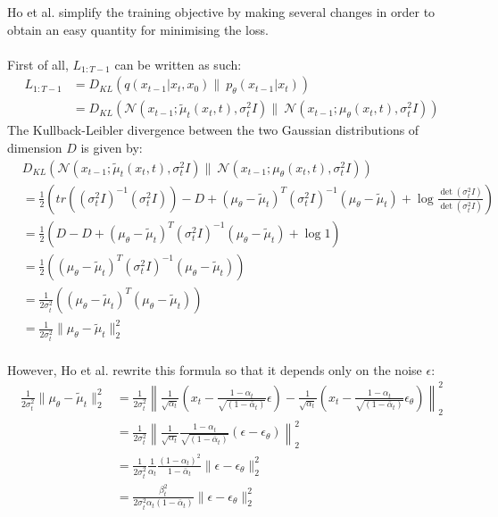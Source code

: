 \documentclass[twoside]{article}
\numberwithin{equation}{section}
\numberwithin{figure}{section}
\begin{document}
Ho et al. \cite{ho2020denoising} simplify the training objective by making several changes in order to obtain an easy quantity for minimising the loss. 
\\\\
First of all, $L_{1: T-1}$ can be written as such:
\begin{align}
  L_{1:T-1} &= D_{KL}\left(q\left(x_{t-1} | x_t, x_0\right) \| \: p_{\theta}\left(x_{t-1} | x_t\right)\right) \\
  &= D_{KL}\left(\mathcal{N} (x_{t-1}; \tilde{\mu}_t \left(x_t, t \right), \sigma^2_t I ) \| \: \mathcal{N} \left( x_{t-1} ; \mu_{\theta}(x_t, t), \sigma^2_t I  \right) \right)
\end{align}
{
  \allowdisplaybreaks
The Kullback-Leibler divergence between the two Gaussian distributions of dimension $D$ is given by:
  \begin{align}
    & D_{KL}\left(\mathcal{N} (x_{t-1}; \tilde{\mu}_t \left(x_t, t \right), \sigma^2_t I ) \| \: \mathcal{N} \left( x_{t-1} ; \mu_{\theta}(x_t, t), \sigma^2_t I  \right) \right) \\
    &= \frac{1}{2} \left( tr\left( (\sigma^2_t I)^{-1} (\sigma^2_t I) \right) - D + \left( \mu_{\theta} - \tilde{\mu}_t \right)^T (\sigma^2_t I)^{-1} \left( \mu_{\theta} - \tilde{\mu}_t \right) + \log \frac{\det(\sigma^2_t I)}{\det(\sigma^2_t I)} \right) \\
    &= \frac{1}{2} \left( D - D + \left( \mu_{\theta} - \tilde{\mu}_t \right)^T (\sigma^2_t I)^{-1} \left( \mu_{\theta} - \tilde{\mu}_t \right) + \log 1 \right) \\
    &= \frac{1}{2} \left( \left( \mu_{\theta} - \tilde{\mu}_t \right)^T (\sigma^2_t I)^{-1} \left( \mu_{\theta} - \tilde{\mu}_t \right) \right) \\
    &= \frac{1}{2 \sigma^2_t} \left( \left( \mu_{\theta} - \tilde{\mu}_t \right)^T \left( \mu_{\theta} - \tilde{\mu}_t \right) \right) \\
    &= \frac{1}{2 \sigma^2_t} \| \mu_{\theta} - \tilde{\mu}_t \|_2^2
  \end{align}
  \\
  However, Ho et al. \cite{ho2020denoising} rewrite this formula so that it depends only on the noise $\epsilon$:
  \begin{align}
    \frac{1}{2 \sigma^2_t} \| \mu_{\theta} - \tilde{\mu}_t \|_2^2 &= \frac{1}{2 \sigma^2_t} \left\| \frac{1}{\sqrt{\alpha_t}} \left( x_t - \frac{1 - \alpha_t}{\sqrt{(1 - \bar{\alpha}_t)}} \epsilon \right) - \frac{1}{\sqrt{\alpha_t}} \left( x_t - \frac{1 - \alpha_t}{\sqrt{(1 - \bar{\alpha}_t)}} \epsilon_\theta \right)\right\|_2^2 \\
    &= \frac{1}{2 \sigma^2_t} \left\| \frac{1}{\sqrt{\alpha_t}} \frac{1 - \alpha_t}{\sqrt{(1 - \bar{\alpha}_t)}} (\epsilon - \epsilon_\theta) \right\|_2^2 \\
    &= \frac{1}{2 \sigma^2_t} \frac{1}{\alpha_t} \frac{(1 - \alpha_t)^2}{1 - \bar{\alpha}_t} \| \epsilon - \epsilon_\theta \|_2^2 \\
    &= \frac{\beta_t^2}{2 \sigma^2_t \alpha_t (1 - \bar{\alpha}_t)} \| \epsilon - \epsilon_\theta \|_2^2
  \end{align}
}
\end{document}
